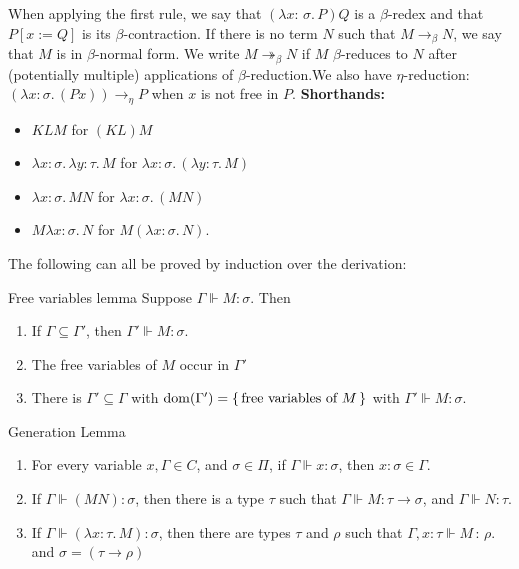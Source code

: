 \documentclass{article}
\numberwithin{thm}{subsection}
\begin{document}
When applying the first rule, we say that $(\lambda x:\, \sigma. \, P) Q$ is a $\beta$-redex and that $P[x:=Q]$ is its $\beta$-contraction.\gap 
If there is no term $N$ such that $M \to_{\beta} N$, we say that $M$ is in $\beta$-normal form. We write $M \twoheadrightarrow_{\beta} N$ if $M$ $\beta$-reduces to $N$ after (potentially multiple) applications of $\beta$-reduction.\gap We also have $\eta$-reduction: $(\lambda x: \sigma. \, (Px)) \to_{\eta} P$ when $x$ is not free in $P$.\gap 
\textbf{Shorthands:} \begin{itemize}
    \item $KLM$ for $(KL)M$
    \item $\lambda x: \sigma. \, \lambda y:\tau.\, M$ for $\lambda x: \sigma. \, (\lambda y: \tau.\, M)$
    \item $\lambda x: \sigma.\, MN$ for $\lambda x: \sigma.\, (MN)$
    \item $M \lambda x: \sigma.\, N$ for $M(\lambda x : \sigma.\, N)$.
\end{itemize}
The following can all be proved by induction over the derivation:
\begin{fancylem}{Free variables lemma}
    Suppose $\Gamma \Vdash M:\sigma.$ Then \begin{enumerate}
        \item If $\Gamma \subseteq \Gamma'$, then $\Gamma' \Vdash M: \sigma$.
        \item The free variables of $M$ occur in $\Gamma'$
        \item There is $\Gamma' \subseteq \Gamma$ with $\operatorname{dom}(\Gamma') = \{\,\text{free variables of $M$}\,\}$ with $\Gamma' \Vdash M: \sigma$.
    \end{enumerate}
\end{fancylem}
\begin{fancylem}{Generation Lemma}\hspace{0.1cm}
    \begin{enumerate}
        \item For every variable $x, \Gamma \in C$, and $\sigma \in \Pi$, if $\Gamma \Vdash x:\sigma$, then $x:\sigma \in \Gamma$.
        \item If $\Gamma \Vdash (MN):\sigma$, then there is a type $\tau$ such that $\Gamma \Vdash M : \tau \to \sigma$, and $\Gamma \Vdash N : \tau$.
        \item If $\Gamma \Vdash (\lambda x : \tau.\, M):\sigma$, then there are types $\tau$ and $\rho$ such that $\Gamma,x : \tau \Vdash M \, : \, \rho$. and $\sigma=(\tau \to \rho)$
    \end{enumerate}
\end{fancylem}
\end{document}
